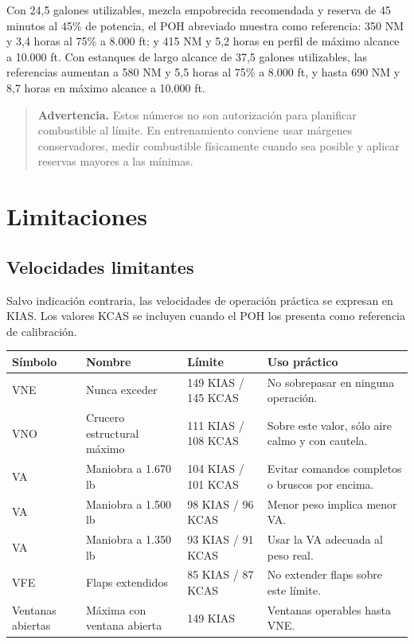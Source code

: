 \documentclass[11pt,oneside]{book}
\newcommand{\warning}[1]{\begin{quote}\small\textbf{Advertencia.} #1\end{quote}}
\begin{document}
Con 24,5 galones utilizables, mezcla empobrecida recomendada y reserva de 45 minutos al 45\% de potencia, el POH abreviado muestra como referencia: 350 NM y 3,4 horas al 75\% a 8.000 ft; y 415 NM y 5,2 horas en perfil de máximo alcance a 10.000 ft. Con estanques de largo alcance de 37,5 galones utilizables, las referencias aumentan a 580 NM y 5,5 horas al 75\% a 8.000 ft, y hasta 690 NM y 8,7 horas en máximo alcance a 10.000 ft.

\warning{Estos números no son autorización para planificar combustible al límite. En entrenamiento conviene usar márgenes conservadores, medir combustible físicamente cuando sea posible y aplicar reservas mayores a las mínimas.}

\chapter{Limitaciones}

\section{Velocidades limitantes}

Salvo indicación contraria, las velocidades de operación práctica se expresan en KIAS. Los valores KCAS se incluyen cuando el POH los presenta como referencia de calibración.

\begin{longtable}{@{}p{}p{}p{}p{}@{}}
\toprule
\textbf{Símbolo} & \textbf{Nombre} & \textbf{Límite} & \textbf{Uso práctico} \\
\midrule
VNE & Nunca exceder & 149 KIAS / 145 KCAS & No sobrepasar en ninguna operación. \\
VNO & Crucero estructural máximo & 111 KIAS / 108 KCAS & Sobre este valor, sólo aire calmo y con cautela. \\
VA & Maniobra a 1.670 lb & 104 KIAS / 101 KCAS & Evitar comandos completos o bruscos por encima. \\
VA & Maniobra a 1.500 lb & 98 KIAS / 96 KCAS & Menor peso implica menor VA. \\
VA & Maniobra a 1.350 lb & 93 KIAS / 91 KCAS & Usar la VA adecuada al peso real. \\
VFE & Flaps extendidos & 85 KIAS / 87 KCAS & No extender flaps sobre este límite. \\
Ventanas abiertas & Máxima con ventana abierta & 149 KIAS & Ventanas operables hasta VNE. \\
\bottomrule
\end{longtable}
\end{document}
